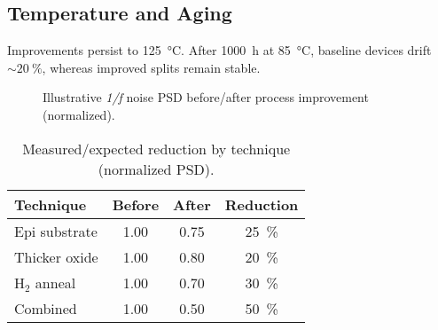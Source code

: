 \documentclass[conference]{IEEEtran}
\begin{document}
\subsection{Temperature and Aging}
Improvements persist to \SI{125}{\celsius}. After 1000~h at \SI{85}{\celsius}, baseline devices drift $\sim\SI{20}{\percent}$, whereas improved splits remain stable.

\begin{figure}[t]
\centering
{}
\caption{Illustrative \emph{1/f} noise PSD before/after process improvement (normalized).}
\label{fig:psd}
\end{figure}

\begin{table}[t]
\caption{Measured/expected reduction by technique (normalized PSD).}
\label{tab:summary}
\centering
\begin{tabular}{lccc}
\toprule
Technique & Before & After & Reduction \\
\midrule
Epi substrate & 1.00 & 0.75 & \SI{25}{\percent} \\
Thicker oxide & 1.00 & 0.80 & \SI{20}{\percent} \\
H$_2$ anneal & 1.00 & 0.70 & \SI{30}{\percent} \\
Combined      & 1.00 & 0.50 & \SI{50}{\percent} \\
\bottomrule
\end{tabular}
\end{table}
\end{document}
